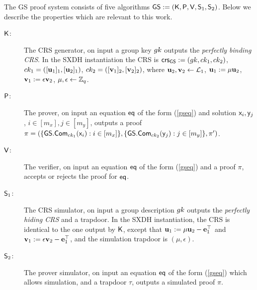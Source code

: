 The GS proof system consists of five algorithms ${\mathsf{GS}}:=(\mathsf{K},\mathsf{P},\mathsf{V},\mathsf{S}_1,\mathsf{S}_2)$. Below we describe the properties which are relevant to this work.
\begin{description}
\item[$\mathsf{K}$:] The CRS generator, on input a group key ${gk}$ outputs the \emph{perfectly binding CRS}.  In the SXDH instantiation the CRS is $\mathsf{crs}_{\mathsf{GS}}:=({gk},ck_1,ck_2)$, 
$ck_1=([\mathbf{u}_1]_1,[\mathbf{u}_2]_1)$,
 $ck_2=([\mathbf{v}_1]_2,[\mathbf{v}_2]_2)$, 
 where $\mathbf{u}_2,\mathbf{v}_2 \gets \mathcal{L}_1$, $\mathbf{u}_1:=\mu \mathbf{u}_2 $, $\mathbf{v}_1:=\epsilon \mathbf{v}_2$, $\mu,\epsilon\gets\mathbb{Z}_q$.
\item[$\mathsf{P}$:] The prover, on input an equation $\mathsf{eq}$ of the form (\ref{gseq}) and solution $\mathsf{x}_i,\mathsf{y}_j$, $i\in[m_x],j\in[m_y]$, outputs a proof $\pi=(\{{\mathsf{GS}}.\mathsf{Com}_{ck_1}(\mathsf{x}_i):i\in[m_x]\},\{{\mathsf{GS}}.\mathsf{Com}_{ck_2}(\mathsf{y}_j):j\in[m_y]\},\pi')$.
\item[$\mathsf{V}$:] The verifier, on input an equation $\mathsf{eq}$ of the form (\ref{gseq}) and a proof $\pi$, accepts or rejects the proof for $\mathsf{eq}$.
\item[$\mathsf{S}_1$:]  The CRS simulator, on input a group description ${gk}$ outputs the \emph{perfectly hiding CRS}  and a trapdoor. In the SXDH instantiation, the CRS is identical to the one output by $\mathsf{K}$, except that $\mathbf{u}_1:=\mu \mathbf{u}_2-\mathbf{e}_1^\top$ and $\mathbf{v}_1:=\epsilon \mathbf{v}_2-\mathbf{e}_1^\top$, and the simulation trapdoor is $(\mu,\epsilon)$.
\item[$\mathsf{S}_2$:] The prover simulator, on input an equation $\mathsf{eq}$ of the form (\ref{gseq}) which allows simulation, and a trapdoor $\tau$, outputs a simulated proof $\pi$.
\end{description}
